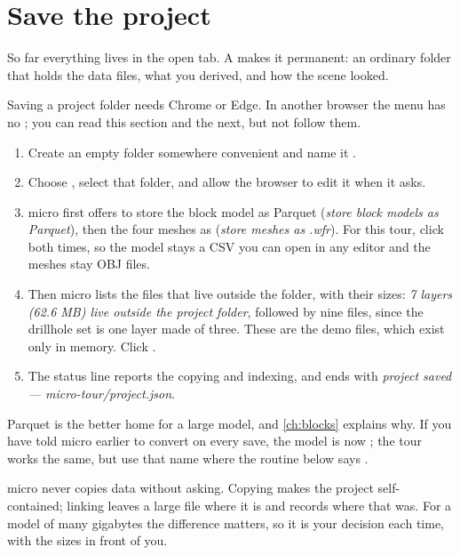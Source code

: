 \section{Save the project}\label{sec:tour-save}
So far everything lives in the open tab. A  makes it permanent: an ordinary folder that holds the data files, what you derived, and how the scene looked.

\begin{caution}
Saving a project folder needs Chrome or Edge. In another browser the  menu has no ; you can read this section and the next, but not follow them.
\end{caution}

\begin{tryit}
\begin{enumerate}
\item Create an empty folder somewhere convenient and name it .
\item Choose , select that folder, and allow the browser to edit it when it asks.
\item micro first offers to store the block model as Parquet (\emph{store block models as Parquet}), then the four meshes as  (\emph{store meshes as .wfr}). For this tour, click  both times, so the model stays a CSV you can open in any editor and the meshes stay OBJ files.
\item Then micro lists the files that live outside the folder, with their sizes: \emph{7 layers (62.6 MB) live outside the project folder}, followed by nine files, since the drillhole set is one layer made of three. These are the demo files, which exist only in memory. Click .
\item The status line reports the copying and indexing, and ends with \emph{project saved — micro-tour/project.json}.
\end{enumerate}
\end{tryit}

Parquet is the better home for a large model, and \cref{ch:blocks} explains why. If you have told micro earlier to convert on every save, the model is now ; the tour works the same, but use that name where the routine below says .

\begin{why}
micro never copies data without asking. Copying makes the project self-contained; linking leaves a large file where it is and records where that was. For a model of many gigabytes the difference matters, so it is your decision each time, with the sizes in front of you.
\end{why}

